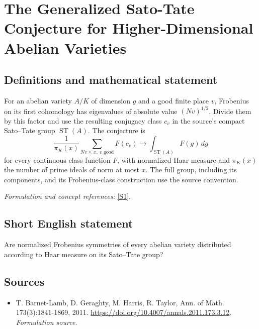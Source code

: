\documentclass[11pt]{article}
\begin{document}
\section*{\texorpdfstring{The Generalized Sato-Tate Conjecture for Higher-Dimensional Abelian Varieties}{The Generalized Sato-Tate Conjecture for Higher-Dimensional Abelian Varieties}}\label{statement}
\subsection{Definitions and mathematical statement}
For an abelian variety $A/K$ of dimension $g$ and a good finite place $v$, Frobenius on its first cohomology has eigenvalues of absolute value $(Nv)^{1/2}$. Divide them by this factor and use the resulting conjugacy class $c_v$ in the source's compact Sato--Tate group $\operatorname{ST}(A)$. The conjecture is
\[
 \frac1{\pi_K(x)}\sum_{Nv\le x,\ v\text{ good}}F(c_v)
 \longrightarrow\int_{\operatorname{ST}(A)}F(g)\,dg
\]
for every continuous class function $F$, with normalized Haar measure and $\pi_K(x)$ the number of prime ideals of norm at most $x$. The full group, including its components, and its Frobenius-class construction use the source convention.
\par\smallskip\textit{Formulation and concept references:} \href{https://doi.org/10.4007/annals.2011.173.3.12}{[S1]}.

\subsection{Short English statement}
Are normalized Frobenius symmetries of every abelian variety distributed according to Haar measure on its Sato--Tate group?
\subsection{Sources}
\begin{itemize}
\item[S1]T. Barnet-Lamb, D. Geraghty, M. Harris, R. Taylor, Ann. of Math. 173(3):1841-1869, 2011.
\url{https://doi.org/10.4007/annals.2011.173.3.12}.
\textit{Formulation source.}
\end{itemize}
\end{document}
